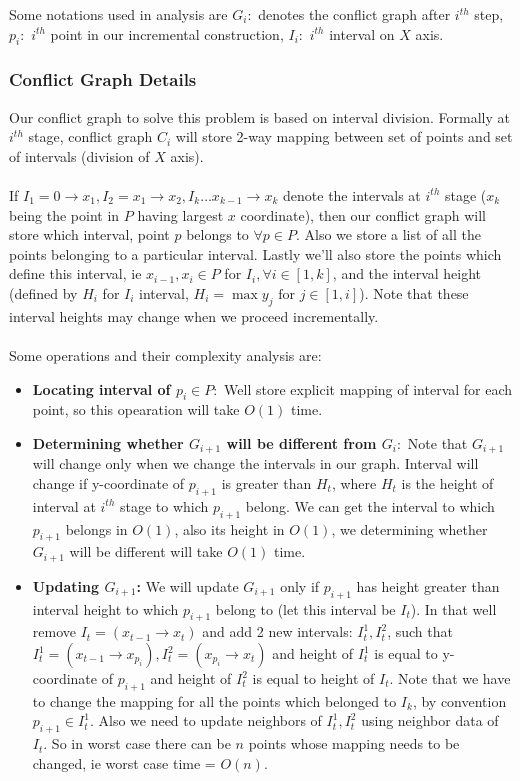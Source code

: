 \documentclass[a4paper]{article}
\begin{document}
Some notations used in analysis are $G_i: $ denotes the conflict graph after $i^{th}$ step, $p_i: $ $i^{th}$ point in our incremental construction, $I_i: $ $i^{th}$ interval on $X$ axis.

\subsubsection*{Conflict Graph Details}
Our conflict graph to solve this problem is based on interval division. Formally at $i^{th}$ stage, conflict graph $C_i$ will store 2-way mapping between set of points and set of intervals (division of $X$ axis). \\ \\ 
If $I_1 = 0\rightarrow x_1, I_2 = x_1 \rightarrow x_2, I_k \ldots x_{k-1} \rightarrow x_{k}$ denote the intervals at $i^{th}$ stage ($x_k$ being the point in $P$ having largest $x$ coordinate), then our conflict graph will store which interval, point $p$ belongs to $\forall p \in P$. Also we store a list of all the points belonging to a particular interval. Lastly we'll also store the points which define this interval, ie $x_{i-1}, x_i\in P$ for $I_i, \forall i \in [1,k]$, and the interval height (defined by $H_{i}$ for $I_i$ interval, $H_i = \max y_j \text{ for } j \in [1,i]$). Note that these interval heights may change when we proceed incrementally.\\ \\
Some operations and their complexity analysis are:
\begin{itemize}
	\item \textbf{Locating interval of $p_i \in P: $} Well store explicit mapping of interval for each point, so this opearation will take $O(1)$ time.
	\item \textbf{Determining whether $G_{i+1}$ will be different from $G_i: $} Note that $G_{i+1}$ will change only when we change the intervals in our graph. Interval will change if y-coordinate of $p_{i+1}$  is greater than $H_{t}$, where $H_{t}$ is the height of interval at $i^{th}$ stage to which $p_{i+1}$ belong. We can get the interval to which $p_{i+1}$ belongs in $O(1)$, also its height in $O(1)$, we determining whether $G_{i+1}$ will be different will take $O(1)$ time.
	\item \textbf{Updating $G_{i+1}$: } We will update $G_{i+1}$ only if $p_{i+1}$ has height greater than interval height to which $p_{i+1}$ belong to (let this interval be $I_t$). In that well remove $I_t = (x_{t-1} \rightarrow x_t)$ and add 2 new intervals: $I^1_t, I^2_t$, such that $I^1_t  = (x_{t-1} \rightarrow x_{p_i}), I^2_t = (x_{p_i} \rightarrow x_t)$ and height of $I^1_t$ is equal to y-coordinate of $p_{i+1}$ and height of $I^2_t$ is equal to height of $I_t$. Note that we have to change the mapping for all the points which belonged to $I_k$, by convention $p_{i+1}\in I^1_t$. Also we need to update neighbors of $I^1_t, I^2_t$ using neighbor data of $I_t$. So in worst case there can be $n$ points whose mapping needs to be changed, ie worst case time = $O(n)$. 
\end{itemize}
\end{document}
